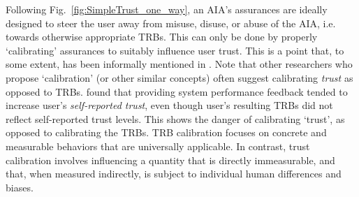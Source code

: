     Following Fig.~\ref{fig:SimpleTrust_one_way}, an AIA's assurances are ideally designed to steer the user away from misuse, disuse, or abuse of the AIA, i.e. towards otherwise appropriate TRBs. This can only be done by properly `calibrating' assurances to suitably influence user trust. This is a point that, to some extent, has been informally mentioned in \cite{Muir1994-ow,Lillard2016-yg,Lee2004-pv,Hutchins2015-if}. Note that other researchers who propose `calibration' (or other similar concepts) often suggest calibrating \emph{trust} as opposed to TRBs. \citet{Dzindolet2003-ts} found that providing system performance feedback tended to increase user's \textit{self-reported trust}, even though user's resulting TRBs did not reflect self-reported trust levels. This shows the danger of calibrating `trust', as opposed to calibrating the TRBs. 
    TRB calibration focuses on concrete and measurable behaviors that are universally applicable. 
    In contrast, trust calibration involves influencing a quantity that is directly immeasurable, and that, when measured indirectly, is subject to individual human differences and biases. 